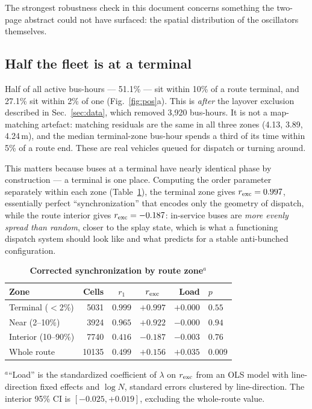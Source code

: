 \documentclass[9pt,twocolumn,twoside]{opticajnl}
\begin{document}
The strongest robustness check in this document concerns something the two-page abstract could
not have surfaced: the spatial distribution of the oscillators themselves.

\subsection{Half the fleet is at a terminal}

Half of all active bus-hours --- 51.1\% --- sit within 10\% of a route terminal, and 27.1\% sit
within 2\% of one (Fig.~\ref{fig:pos}a). This is \emph{after} the layover exclusion described in
Sec.~\ref{sec:data}, which removed 3{,}920 bus-hours. It is not a map-matching artefact:
matching residuals are the same in all three zones (4.13, 3.89, 4.24\,m), and the median
terminal-zone bus-hour spends a third of its time within 5\% of a route end. These are real
vehicles queued for dispatch or turning around.

This matters because buses at a terminal have nearly identical phase by construction --- a
terminal is one place. Computing the order parameter separately within each zone
(Table~\ref{tab:zones}), the terminal zone gives $r_{\rm exc} = 0.997$, essentially perfect
``synchronization'' that encodes only the geometry of dispatch, while the route interior gives
$r_{\rm exc} = -0.187$: in-service buses are \emph{more evenly spread than random}, closer to
the splay state, which is what a functioning dispatch system should look like and what
\cite{chew19} predicts for a stable anti-bunched configuration.

\begin{table}[t]
\centering
\caption{\bf Corrected synchronization by route zone$^{a}$}
\small
\setlength{\tabcolsep}{3.2pt}
\begin{tabular}{lrccrl}
\toprule
Zone & Cells & $r_1$ & $r_{\rm exc}$ & Load & $p$ \\
\midrule
Terminal ($<$2\%)   & 5031 & $0.999$ & $+0.997$ & $+0.000$ & $0.55$ \\
Near (2--10\%)      & 3924 & $0.965$ & $+0.922$ & $-0.000$ & $0.94$ \\
Interior (10--90\%) & 7740 & $0.416$ & $-0.187$ & $-0.003$ & $0.76$ \\
\midrule
Whole route        & 10135 & $0.499$ & $+0.156$ & $+0.035$ & $0.009$ \\
\bottomrule
\end{tabular}
\label{tab:zones}

\smallskip
$^{a}$``Load'' is the standardized coefficient of $\lambda$ on $r_{\rm exc}$ from an OLS model
with line-direction fixed effects and $\log N$, standard errors clustered by line-direction.
The interior 95\% CI is $[-0.025,+0.019]$, excluding the whole-route value.
\end{table}
\end{document}
